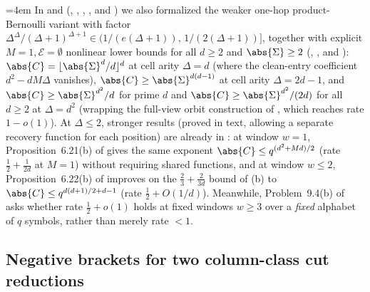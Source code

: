 \begin{remark}\label{rem:capacity-context}
{\emergencystretch=4em
In  and 
(, ,
, , and
) we also formalized the weaker one-hop product-Bernoulli
variant with factor $\Delta^\Delta/(\Delta+1)^{\Delta+1} \in \bigl(1/(e(\Delta+1)),\,
1/(2(\Delta+1))\bigr]$, together with explicit $M = 1, \mathcal{E} = \emptyset$ nonlinear lower bounds
for all $d \ge 2$ and $\abs{\Sigma} \ge 2$ (,
, and
):
$\abs{C} = \lfloor\abs{\Sigma}^d / d\rfloor^d$ at cell arity $\Delta = d$ (where the clean-entry
coefficient $d^2 - dM\Delta$ vanishes), $\abs{C} \ge \abs{\Sigma}^{d(d-1)}$ at cell arity
$\Delta = 2d - 1$, and $\abs{C} \ge \abs{\Sigma}^{d^2}/d$ for prime $d$ and
$\abs{C} \ge \abs{\Sigma}^{d^2}/(2d)$ for all $d \ge 2$ at $\Delta = d^2$ (wrapping the full-view
orbit construction of \cite[Theorem~A.1 and Corollary~A.2]{SharedDecoders2026}, which reaches rate
$1 - o(1)$). At $\Delta \le 2$, stronger results (proved
in text, allowing a separate recovery function for each position) are already in
\cite{SeventeenthPaper2026}: at window $w = 1$, Proposition~6.21(b) of \cite{SeventeenthPaper2026}
gives the same exponent $\abs{C} \le q^{(d^2 + Md)/2}$ (rate $\frac{1}{2} + \frac{1}{2d}$ at
$M = 1$) without requiring shared functions, and at window $w \le 2$,
Proposition~6.22(b) of \cite{SeventeenthPaper2026} improves on the $\frac{2}{3} + \frac{2}{3d}$ bound
of (b) to $\abs{C} \le q^{d(d+1)/2 + d - 1}$ (rate
$\frac{1}{2} + O(1/d)$).
Meanwhile, Problem~9.4(b) of \cite{SeventeenthPaper2026} asks whether rate $\frac{1}{2} + o(1)$ holds
at fixed windows $w \ge 3$ over a \emph{fixed} alphabet of $q$ symbols, rather than merely rate
$< 1$.\par}
\end{remark}

\subsection{Negative brackets for two column-class cut reductions}\label{sec:sweep-remark}

